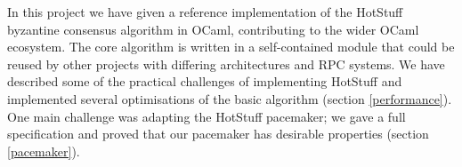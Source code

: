 




In this project we have given a reference implementation of the HotStuff byzantine consensus algorithm in OCaml, contributing to the wider OCaml ecosystem. The core algorithm is written in a self-contained module that could be reused by other projects with differing architectures and RPC systems. We have described some of the practical challenges of implementing HotStuff and implemented several optimisations of the basic algorithm (section \ref{performance}). One main challenge was adapting the HotStuff pacemaker; we gave a full specification and proved that our pacemaker has desirable properties (section \ref{pacemaker}).

